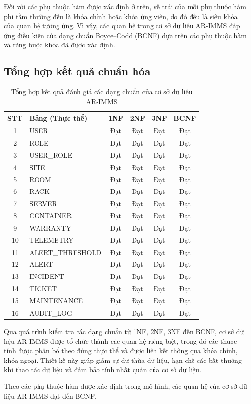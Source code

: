 Đối với các phụ thuộc hàm được xác định ở trên, vế trái của mỗi phụ thuộc hàm phi tầm thường đều là khóa chính hoặc khóa ứng viên, do đó đều là siêu khóa của quan hệ tương ứng. Vì vậy, các quan hệ trong cơ sở dữ liệu AR-IMMS đáp ứng điều kiện của dạng chuẩn Boyce–Codd (BCNF) dựa trên các phụ thuộc hàm và ràng buộc khóa đã được xác định.

\subsection{Tổng hợp kết quả chuẩn hóa}

\begin{table}[H]
\centering
\caption{Tổng hợp kết quả đánh giá các dạng chuẩn của cơ sở dữ liệu AR-IMMS}
\begin{tabular}{|c|l|c|c|c|c|}
\hline
\textbf{STT} & \textbf{Bảng (Thực thể)} & \textbf{1NF} & \textbf{2NF} & \textbf{3NF} & \textbf{BCNF} \\ \hline
1 & USER & Đạt & Đạt & Đạt & Đạt \\ \hline
2 & ROLE & Đạt & Đạt & Đạt & Đạt \\ \hline
3 & USER\_ROLE & Đạt & Đạt & Đạt & Đạt \\ \hline
4 & SITE & Đạt & Đạt & Đạt & Đạt \\ \hline
5 & ROOM & Đạt & Đạt & Đạt & Đạt \\ \hline
6 & RACK & Đạt & Đạt & Đạt & Đạt \\ \hline
7 & SERVER & Đạt & Đạt & Đạt & Đạt \\ \hline
8 & CONTAINER & Đạt & Đạt & Đạt & Đạt \\ \hline
9 & WARRANTY & Đạt & Đạt & Đạt & Đạt \\ \hline
10 & TELEMETRY & Đạt & Đạt & Đạt & Đạt \\ \hline
11 & ALERT\_THRESHOLD & Đạt & Đạt & Đạt & Đạt \\ \hline
12 & ALERT & Đạt & Đạt & Đạt & Đạt \\ \hline
13 & INCIDENT & Đạt & Đạt & Đạt & Đạt \\ \hline
14 & TICKET & Đạt & Đạt & Đạt & Đạt \\ \hline
15 & MAINTENANCE & Đạt & Đạt & Đạt & Đạt \\ \hline
16 & AUDIT\_LOG & Đạt & Đạt & Đạt & Đạt \\ \hline
\end{tabular}
\end{table}

Qua quá trình kiểm tra các dạng chuẩn từ 1NF, 2NF, 3NF đến BCNF, cơ sở dữ liệu AR-IMMS được tổ chức thành các quan hệ riêng biệt, trong đó các thuộc tính được phân bổ theo đúng thực thể và được liên kết thông qua khóa chính, khóa ngoại. Thiết kế này giúp giảm sự dư thừa dữ liệu, hạn chế các bất thường khi thao tác dữ liệu và đảm bảo tính nhất quán của cơ sở dữ liệu.

Theo các phụ thuộc hàm được xác định trong mô hình, các quan hệ của cơ sở dữ liệu AR-IMMS đạt đến BCNF.

